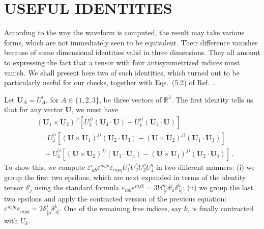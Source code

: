 \documentclass[aps, prd,
twocolumn,%
superscriptaddress,
showpacs, nofootinbib, eqsecnum, amsmath, amssymb, floatfix
]{revtex4}
\begin{document}
\appendix*


\section{USEFUL IDENTITIES}

According to the way the waveform is computed, the result may take various
forms, which are not immediately seen to be equivalent. Their difference
vanishes because of some dimensional identities valid in three dimensions. They all
amount to expressing the fact that a tensor with four antisymmetrized indices
must vanish. We shall present here two of such identities, which turned out to
be particularly useful for our checks, together with Eqs.~(5.2) of
Ref.~\cite{Faye-Blanchet-Buonanno:2006}.

Let $\bm{U}_A=U_A^i$, for $A\in \{1,2,3\}$, be three vectors of $\mathbb{R}^3$.
The first identity tells us that for any vector $\bm{U}$, we must have
%
\begin{align}
& (\bm{U}_1 \times \bm{U}_2)^{(i} [U_3^{j)} (\bm{U}_4 \cdot \bm{U}) - U_4^{j)}
(\bm{U}_3 \cdot \bm{U})]
 \\ & ~ =
U_4^{(i} [(\bm{U}\times \bm{U}_1)^{j)} (\bm{U}_2 \cdot \bm{U}_3) -  (\bm{U}\times
\bm{U}_2)^{j)} (\bm{U}_1 \cdot \bm{U}_3)] \nonumber \\ & \quad + U_3^{(i}
[(\bm{U}\times \bm{U}_2)^{j)} (\bm{U}_1 \cdot \bm{U}_4) - (\bm{U}\times
\bm{U}_1)^{j)} (\bm{U}_2 \cdot \bm{U}_4)] \, .
\nonumber \end{align}
%
To show this, we compute $\varepsilon^i_{~ab} \varepsilon^{mjk}
\varepsilon_{mpq} U_1^a U_2^b U_3^p U_4^q$ in two different manners:
(i) we group the first two epsilons, which are next expanded in
terms of the identity tensor $\delta^i_{~j}$ using the standard
formula $\varepsilon_{iab} \varepsilon^{mjk} =3! \delta_{~[i}^m
\delta_{~a}^j \delta_{~b]}^k$; (ii) we group the last two epsilons
and apply the contracted version of the previous equation:
$\varepsilon^{mjk} \varepsilon_{mpq} = 2 \delta^j_{~[p}
\delta^k_{~q]}$. One of the remaining free indices, say $k$, is
finally contracted with $U_k$.
\end{document}
